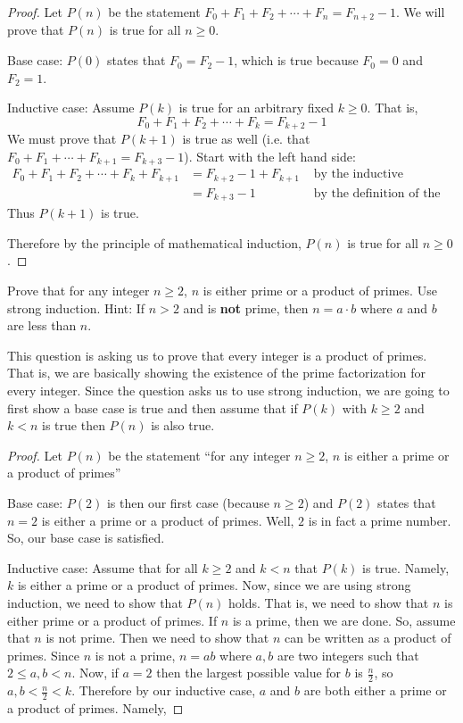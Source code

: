 \documentclass[11pt]{exam}
\begin{document}
\begin{questions}
\begin{solution}
  \begin{proof}
    Let $P(n)$ be the statement $F_0 + F_1 + F_2 + \cdots + F_n = F_{n+2} - 1$.  We will prove that $P(n)$ is true for all $n \ge 0$.  
    
    Base case: $P(0)$ states that $F_0 = F_2 - 1$, which is true because $F_0 = 0$ and $F_2 = 1$.
    
    Inductive case:  Assume $P(k)$ is true for an arbitrary fixed $k \ge 0$.  That is, \[F_0 + F_1 + F_2 + \cdots + F_k = F_{k+2} - 1\]
    We must prove that $P(k+1)$ is true as well (i.e. that $F_0 + F_1 + \cdots +F_{k+1} = F_{k+3} - 1$).  Start with the left hand side:
    \begin{align*}
      F_0 + F_1 + F_2 + \cdots + F_k + F_{k+1} & = F_{k+2} - 1 + F_{k+1} & \mbox{ by the inductive hypothesis}\\
      & = F_{k+3} - 1 & \mbox{ by the definition of the Fibonacci numbers}
    \end{align*}
    Thus $P(k+1)$ is true.
    
    Therefore by the principle of mathematical induction, $P(n)$ is true for all $n \ge 0$.
  \end{proof}

\end{solution}

\question[8] Prove that for any integer $n\geq 2$, $n$ is either prime or a product of primes. Use strong induction.  Hint: If $n > 2$ and is {\bf not} prime, then $n = a\cdot b$ where $a$ and $b$ are less than $n$.

\begin{solution}
This question is asking us to prove that every integer is a product of primes. That is, we are basically showing the existence of the prime factorization for every integer. Since the question asks us to use strong induction, we are going to first show a base case is true and then assume that if $P(k)$ with $k\geq 2$ and $k<n$ is true then $P(n)$ is also true.
\begin{proof}
Let $P(n)$ be the statement ``for any integer $n\geq 2$, $n$ is either a prime or a product of primes''

Base case: $P(2)$ is then our first case (because $n\geq 2$) and $P(2)$ states that $n=2$ is either a prime or a product of primes. Well, $2$ is in fact a prime number. So, our base case is satisfied.

Inductive case: Assume that for all $k\geq 2$ and $k<n$ that $P(k)$ is true. Namely, $k$ is either a prime or a product of primes. Now, since we are using strong induction, we need to show that $P(n)$ holds. That is, we need to show that $n$ is either prime or a product of primes. If $n$ is a prime, then we are done. So, assume that $n$ is not prime. Then we need to show that $n$ can be written as a product of primes. Since $n$ is not a prime, $n=ab$ where $a,b$ are two integers such that $2 \leq a, b<n$. Now, if $a=2$ then the largest possible value for $b$ is $\frac{n}{2}$, so $a,b< \frac{n}{2} <k$. Therefore by our inductive case, $a$ and $b$ are both either a prime or a product of primes. Namely,


\end{proof}
\end{solution}
\end{questions}
\end{document}
